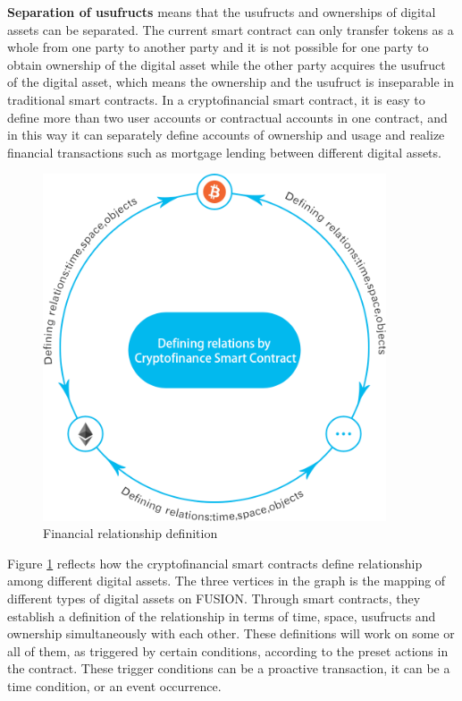 \documentclass[a4paper,12pt]{article}
\begin{document}
{\bfseries Separation of usufructs} means that the usufructs and ownerships of digital assets can be separated. The current smart contract can only transfer tokens as a whole from one party to another party and it is not possible for one party to obtain ownership of the digital asset while the other party acquires the usufruct of the digital asset, which means the ownership and the usufruct is inseparable in traditional smart contracts. In a cryptofinancial smart contract, it is easy to define more than two user accounts or contractual accounts in one contract, and in this way it can separately define accounts of ownership and usage and realize financial transactions such as mortgage lending between different digital assets.

\begin{figure} [htbp]
\centering \includegraphics [width = 4in]{pic/financialization.png}
\caption{Financial relationship definition} \label{fig: frd}
\end{figure}

Figure \ref{fig: frd} reflects how the cryptofinancial smart contracts define relationship among different digital assets. The three vertices in the graph is the mapping of different types of digital assets on FUSION. Through smart contracts, they establish a definition of the relationship in terms of time, space, usufructs and ownership simultaneously with each other. These definitions will work on some or all of them, as triggered by certain conditions, according to the preset actions in the contract. These trigger conditions can be a proactive transaction, it can be a time condition, or an event occurrence.
\end{document}
